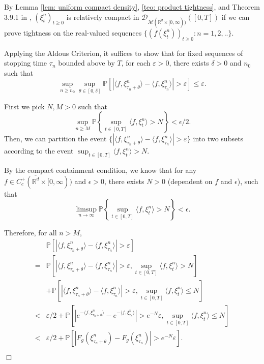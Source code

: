 \documentclass[12pt]{article}
\newenvironment {proof}{{\noindent\bf Proof }}{\hfill $\Box$ \medskip}
\begin{document}
\begin{proof}
By Lemma  \ref{lem: uniform compact density}, \ref{teo: product tightness}, and Theorem 3.9.1 in \cite{EK},
 $(\xi^n_t )_{t\geq 0}$ is relatively compact in $\mathcal{D}_{\mathcal{M}(\overline{\mathbb{R}^d} \times[0,\infty))}([0,T])$
 if we can prove tightness on the real-valued sequences
$\{(f(\xi^n_t))_{t \geq 0}: n=1,2,.. \}$.

Applying the Aldous Criterion, it suffices to show that
for fixed sequences of stopping time $\tau_n$ bounded above by $T$,
for each $\varepsilon>0$,
there exists $\delta > 0$ and $n_0$ such that
\begin{equation}
\sup_{n \geq n_0}\sup_{\theta \in [0, \delta]} \mathbb{P}\left[|\langle f, \xi^n_{\tau_n+\theta}\rangle - \langle f, \xi^n_{\tau_n}\rangle | > \varepsilon \right] \leq \varepsilon.
\end{equation}

First we pick $N,M>0$ such that 
 $$\sup_{n \geq M} \mathbb{P}\left\{ \sup_{t\in [0,T]}\langle f, \xi^n_t \rangle > N \right\} < \epsilon /2 .$$
Then, we can partition the event $\{|\langle f, \xi^n_{\tau_n+\theta}\rangle - \langle f, \xi^n_{\tau_n}\rangle | > \varepsilon\}$ into two subsets according to the event 
$ \sup_{t\in [0,T]}\langle f, \xi^n_t \rangle > N$.

By the compact containment condition, 
we know that for any $f \in C^{+}_{c}(\overline{\mathbb{R}^d} \times [0,\infty))$ and $\epsilon > 0$, there exists $N>0$ (dependent on $f$ and $\epsilon$), 
such that 
\begin{equation}
\label{eq: vague compact containment condition}
 \limsup_{n \to \infty} \mathbb{P}\left\{ \sup_{t\in [0,T]}\langle f, \xi^n_t \rangle > N \right\} < \epsilon.
\end{equation}

Therefore, for all $n>M$,
\begin{equation}
\begin{aligned}
 &\mathbb{P}\left[|\langle f, \xi^n_{\tau_n+\theta}\rangle - \langle f, \xi^n_{\tau_n}\rangle | > \varepsilon \right]\\
 =& \mathbb{P}\left[|\langle f, \xi^n_{\tau_n+\theta}\rangle - \langle f, \xi^n_{\tau_n}\rangle | > \varepsilon ,  \sup_{t\in [0,T]}\langle f, \xi^n_t \rangle > N \right]\\
 & + \mathbb{P}\left[|\langle f, \xi^n_{\tau_n+\theta}\rangle - \langle f, \xi^n_{\tau_n}\rangle | > \varepsilon,  \sup_{t\in [0,T]}\langle f, \xi^n_t \rangle \leq N \right]\\
< & \varepsilon/2 + \mathbb{P}\left[|e^{-\langle f, \xi^n_{\tau_n+\theta}\rangle} - e^{-\langle f, \xi^n_{\tau_n}\rangle }| > e^{-N}\varepsilon,  \sup_{t\in [0,T]}\langle f, \xi^n_t \rangle \leq N \right]\\
< & \varepsilon/2 + \mathbb{P}\left[|F_g(\xi^n_{\tau_n+\theta})-F_g(\xi^n_{\tau_n})| > e^{-N}\varepsilon\right].
\end{aligned}
\end{equation}


\end{proof}
\end{document}
